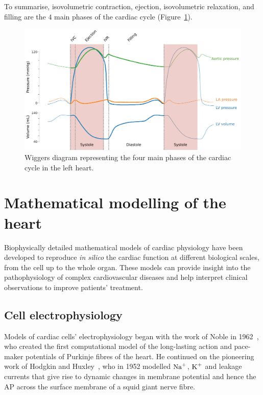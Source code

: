 \vspace{0.2cm}
To summarise, isovolumetric contraction, ejection, isovolumetric relaxation, and filling are the $4$ main phases of the cardiac cycle (Figure~\ref{fig:wiggersdiagram}).

\begin{figure}[!ht]
    \myfloatalign
    \includegraphics[width=\textwidth]{figures/chapter01/wiggers_diagram.pdf}
    \caption{Wiggers diagram representing the four main phases of the cardiac cycle in the left heart.}
    \label{fig:wiggersdiagram}
\end{figure}


%
%
%
\section{Mathematical modelling of the heart}\label{sec:ch1mathematical_modelling_of_the_heart}
Biophysically detailed mathematical models of cardiac physiology have been developed to reproduce \textit{in silico} the cardiac function at different biological scales, from the cell up to the whole organ. These models can provide insight into the pathophysiology of complex cardiovascular diseases and help interpret clinical observations to improve patients' treatment.


%
%
%
\subsection{Cell electrophysiology}\label{sec:cell_ep_modelling}
Models of cardiac cells' electrophysiology began with the work of Noble in 1962~\cite{Noble:1962}, who created the first computational model of the long-lasting action and pace-maker potentials of Purkinje fibres of the heart. He continued on the pioneering work of Hodgkin and Huxley~\cite{Hodgkin:1952}, who in 1952 modelled $\textrm{Na}^{+}$, $\textrm{K}^{+}$ and leakage currents that give rise to dynamic changes in membrane potential and hence the AP across the surface membrane of a squid giant nerve fibre. 

